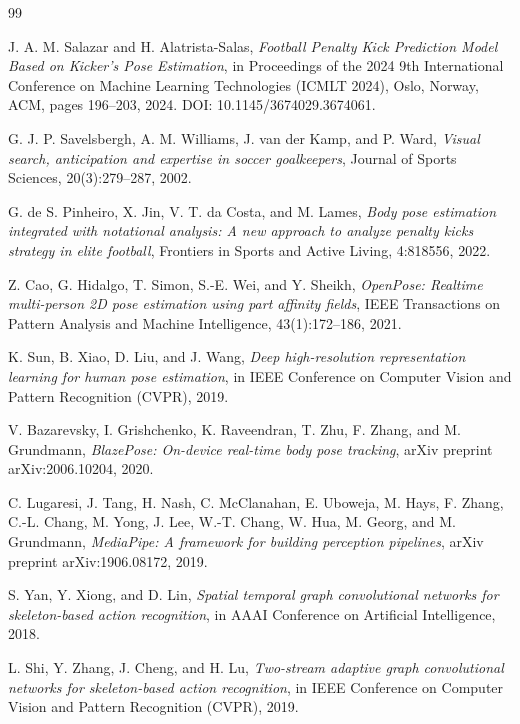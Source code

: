 \clearpage
\renewcommand{\bibname}{References}

\begin{thebibliography}{99}

J. A. M. Salazar and H. Alatrista-Salas,
\textit{Football Penalty Kick Prediction Model Based on Kicker's Pose Estimation},
in Proceedings of the 2024 9th International Conference on Machine Learning Technologies (ICMLT 2024),
Oslo, Norway, ACM, pages 196--203, 2024. DOI: 10.1145/3674029.3674061.

G. J. P. Savelsbergh, A. M. Williams, J. van der Kamp, and P. Ward,
\textit{Visual search, anticipation and expertise in soccer goalkeepers},
Journal of Sports Sciences, 20(3):279--287, 2002.

G. de S. Pinheiro, X. Jin, V. T. da Costa, and M. Lames,
\textit{Body pose estimation integrated with notational analysis: A new approach to analyze penalty kicks strategy in elite football},
Frontiers in Sports and Active Living, 4:818556, 2022.

Z. Cao, G. Hidalgo, T. Simon, S.-E. Wei, and Y. Sheikh,
\textit{OpenPose: Realtime multi-person 2D pose estimation using part affinity fields},
IEEE Transactions on Pattern Analysis and Machine Intelligence, 43(1):172--186, 2021.

K. Sun, B. Xiao, D. Liu, and J. Wang,
\textit{Deep high-resolution representation learning for human pose estimation},
in IEEE Conference on Computer Vision and Pattern Recognition (CVPR), 2019.

V. Bazarevsky, I. Grishchenko, K. Raveendran, T. Zhu, F. Zhang, and M. Grundmann,
\textit{BlazePose: On-device real-time body pose tracking},
arXiv preprint arXiv:2006.10204, 2020.

C. Lugaresi, J. Tang, H. Nash, C. McClanahan, E. Uboweja, M. Hays, F. Zhang, C.-L. Chang, M. Yong, J. Lee, W.-T. Chang, W. Hua, M. Georg, and M. Grundmann,
\textit{MediaPipe: A framework for building perception pipelines},
arXiv preprint arXiv:1906.08172, 2019.

S. Yan, Y. Xiong, and D. Lin,
\textit{Spatial temporal graph convolutional networks for skeleton-based action recognition},
in AAAI Conference on Artificial Intelligence, 2018.

L. Shi, Y. Zhang, J. Cheng, and H. Lu,
\textit{Two-stream adaptive graph convolutional networks for skeleton-based action recognition},
in IEEE Conference on Computer Vision and Pattern Recognition (CVPR), 2019.


\end{thebibliography}
